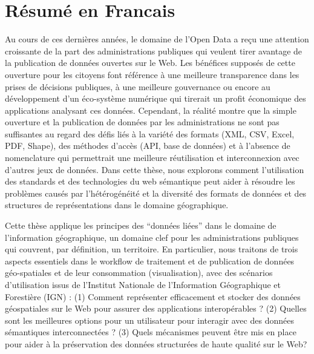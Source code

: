 \chapter{R\'{e}sum\'{e} en Francais} \label{chap:resume}

Au cours de ces derni\`{e}res ann\'{e}es, le domaine de l'Open Data a reçu une attention croissante de la part des administrations publiques qui veulent tirer avantage de la publication de donn\'{e}es ouvertes sur le Web. Les b\'{e}n\'{e}fices suppos\'{e}s de cette ouverture pour les citoyens font r\'{e}f\'{e}rence à une meilleure transparence dans les prises de d\'{e}cisions publiques, à une meilleure gouvernance ou encore au d\'{e}veloppement d'un \'{e}co-syst\`{e}me num\'{e}rique qui tirerait un profit \'{e}conomique des applications analysant ces donn\'{e}es. Cependant, la r\'{e}alit\'{e} montre que la simple ouverture et la publication de donn\'{e}es par les administrations ne sont pas suffisantes au regard des d\'{e}fis li\'{e}s à la vari\'{e}t\'{e} des formats (XML, CSV, Excel, PDF, Shape), des m\'{e}thodes d'acc\`{e}s (API, base de donn\'{e}es) et à l'absence de nomenclature qui permettrait une meilleure r\'{e}utilisation et interconnexion avec d'autres jeux de donn\'{e}es. Dans cette th\`{e}se, nous explorons comment l'utilisation des standards et des technologies du web s\'{e}mantique peut aider à r\'{e}soudre les probl\`{e}mes caus\'{e}s par l'h\'{e}t\'{e}rog\'{e}n\'{e}it\'{e} et la diversit\'{e} des formats de donn\'{e}es et des structures de repr\'{e}sentations dans le domaine g\'{e}ographique.

Cette th\`{e}se applique les principes des ``donn\'{e}es li\'{e}es'' dans le domaine de l'information g\'{e}ographique, un domaine clef pour les administrations publiques qui couvrent, par d\'{e}finition, un territoire. En particulier, nous traitons de trois aspects essentiels dans le workflow de traitement et de publication de donn\'{e}es g\'{e}o-spatiales et de leur consommation (visualisation), avec des sc\'{e}narios d'utilisation issus de l’Institut Nationale de l’Information G\'{e}ographique et Foresti\`{e}re (IGN) : (1) Comment repr\'{e}senter efficacement et stocker des donn\'{e}es g\'{e}ospatiales sur le Web pour assurer des applications interop\'{e}rables ? (2) Quelles sont les meilleures options pour un utilisateur pour interagir avec des donn\'{e}es s\'{e}mantiques interconnect\'{e}es ? (3) Quels m\'{e}canismes peuvent \^{e}tre mis en place pour aider à la pr\'{e}servation des donn\'{e}es structur\'{e}es de haute qualit\'{e} sur le Web?

